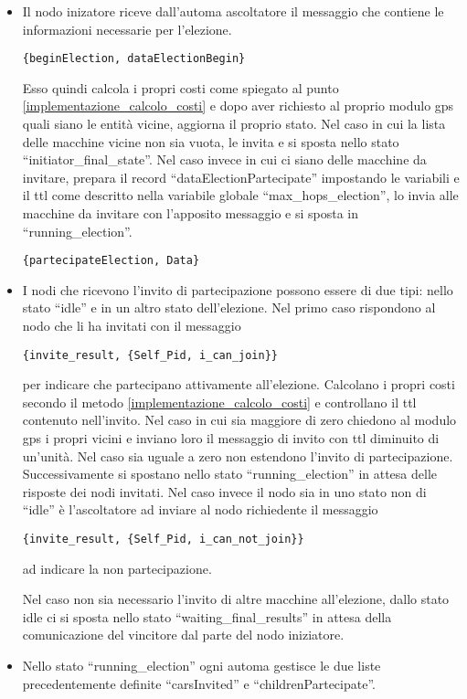 \begin{itemize}
	\item Il nodo inizatore riceve dall'automa ascoltatore il messaggio che contiene le informazioni necessarie per l'elezione. 

	\lstinline|{beginElection, dataElectionBegin}|

	Esso quindi calcola i propri costi come spiegato al punto \ref{implementazione_calcolo_costi} e dopo aver richiesto al proprio modulo gps quali siano le entità vicine, aggiorna il proprio stato. Nel caso in cui la lista delle macchine vicine non sia vuota, le invita e si sposta nello stato ``initiator\_final\_state''. Nel caso invece in cui ci siano delle macchine da invitare, prepara il record ``dataElectionPartecipate'' impostando le variabili e il ttl come descritto nella variabile globale ``max\_hops\_election'', lo invia alle macchine da invitare con l'apposito messaggio e si sposta in ``running\_election''.

	\lstinline|{partecipateElection, Data}|
	\item I nodi che ricevono l'invito di partecipazione possono essere di due tipi: nello stato ``idle'' e in un altro stato dell'elezione. Nel primo caso rispondono al nodo che li ha invitati con il messaggio 

	\lstinline |{invite_result, {Self_Pid, i_can_join}}|
	
	per indicare che partecipano attivamente all'elezione. Calcolano i propri costi secondo il metodo \ref{implementazione_calcolo_costi} e controllano il ttl contenuto nell'invito. Nel caso in cui sia maggiore di zero chiedono al modulo gps i propri vicini e inviano loro il messaggio di invito con ttl diminuito di un'unità. Nel caso sia uguale a zero non estendono l'invito di partecipazione. Successivamente si spostano nello stato ``running\_election'' in attesa delle risposte dei nodi invitati. Nel caso invece il nodo sia in uno stato non di ``idle'' è l'ascoltatore ad inviare al nodo richiedente il messaggio

	\lstinline |{invite_result, {Self_Pid, i_can_not_join}}|

	ad indicare la non partecipazione.

	Nel caso non sia necessario l'invito di altre macchine all'elezione, dallo stato idle ci si sposta nello stato ``waiting\_final\_results'' in attesa della comunicazione del vincitore dal parte del nodo iniziatore.
	\item Nello stato ``running\_election'' ogni automa gestisce le due liste precedentemente definite ``carsInvited'' e ``childrenPartecipate''. 
	

\end{itemize}
